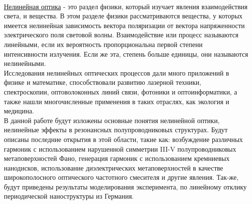 \\
\hspace*{2mm}
\underline{Нелинейная оптика} - это раздел физики, который изучает явления взаимодействия света, и вещества. В этом разделе физики рассматриваются вещества, у которых имеется нелинейная зависимость вектора поляризации от вектора напряженности электрического поля световой волны. Взаимодействие или процесс называются линейными, если их вероятность пропорциональна первой степени интенсивности излучения. Если же эта, степень больше единицы, они называются нелинейными.
\\
\hspace*{2mm}
Исследования нелинейных оптических процессов дали много приложений в физике и математике, способствовали развитию лазерной техники, спектроскопии, оптоволоконных линий связи, фотоники и оптоинформатики, а также нашли многочисленные применения в таких отраслях, как экология и медицина.
\\
\hspace*{2mm}
В данной работе будут изложены основные понятия нелинейной оптики, нелинейные эффекты в резонансных полупроводниковых структурах. Будут описаны последние открытия в этой области, такие как: возбуждение различных гармоник с использованием нарушенной симметрии III-V полупроводниковых метаповерхностей Фано, генерация гармоник с использованием кремниевых нанодисков, использование диэлектрических метаповерхностей в качестве широкополосного оптического частотного смесителя и другие явления. Так-же, будут приведены результаты моделирования эксперимента, по линейному отклику периодической наноструктуры из Германия.

